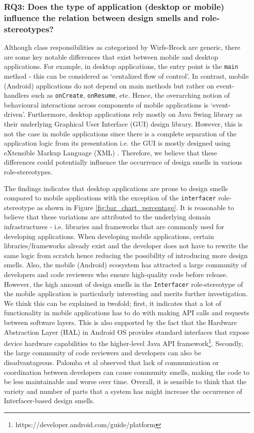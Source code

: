 \documentclass[AMA,Times1COL]{WileyNJDv5} %
\begin{document}
	\subsubsection*{RQ3: Does the type of application (desktop or mobile) influence the relation between design smells and role-stereotypes?}
	Although class responsibilities as categorized by Wirfs-Brock\cite{wirfs2006characterizing} are generic, there are some key notable differences that exist between mobile and desktop applications. For example, in desktop applications, the entry point is the {\tt main} method - this can be considered as `centalized flow of control'. In contrast, mobile (Android) applications do not depend on main methods but rather on event-handlers such as {\tt onCreate}, {\tt onResume}, etc. Hence, the overarching notion of behavioural interactions across components of mobile applications is `event-driven'.
	Furthermore,  desktop applications rely mostly on Java Swing library as their underlying Graphical User Interface (GUI) design library. However, this is not the case in mobile applications since there is a complete separation of the application logic from its presentation i.e. the  GUI  is mostly designed using eXtensible  Markup  Language (XML) \cite{mannan2016understanding}. Therefore, we believe that these differences could potentially influence the occurrence of design smells in various role-stereotypes.
	
	The findings indicates that desktop applications are prone to design smells compared to mobile applications with the exception of the {\tt interfacer} role-stereotype as shown in Figure \ref{fig:bar_chart_percentage}. It is reasonable to believe that these variations are attributed to the underlying domain infrastructures - i.e. libraries and frameworks that are commonly used for developing applications. When developing mobile applications, certain libraries/frameworks  already exist and the developer does not have to rewrite the same logic from scratch hence reducing the possibility of introducing more design smells. Also, the mobile (Android) ecosystem has attracted a large community of developers and code reviewers who ensure high-quality code before release. However, the high amount of design smells in the {\tt Interfacer} role-stereotype of the mobile application is particularly interesting and merits further investigation. We think this can be explained in twofold; first, it indicates that a lot of functionality in mobile applications has to do with making API calls and requests between software layers. This is also supported by the fact that the Hardware Abstraction Layer (HAL) in Android OS provides standard interfaces that expose device hardware capabilities to the higher-level Java API framework\footnote{https://developer.android.com/guide/platform}. Secondly, the large community of code reviewers and developers can also be disadvantageous. Palomba et al\cite{palomba2018beyond} observed that lack of communication or coordination between developers can cause community smells, making the code to be less maintainable and worse over time. Overall, it is sensible to think that the variety and number of parts that a system has might increase the occurrence of Interfacer-based design smells.
	
\end{document}
